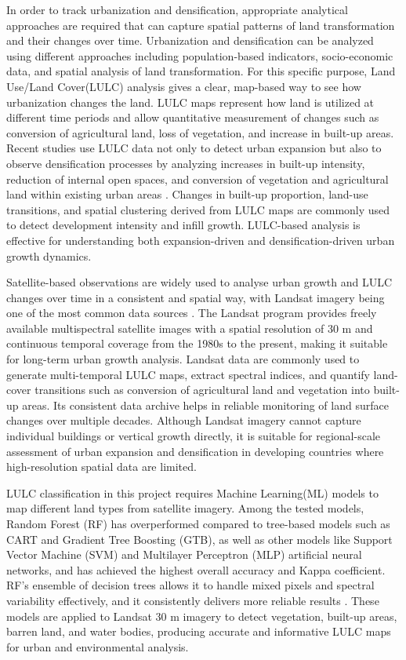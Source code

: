 \documentclass[main]{subfiles}
\begin{document}
In order to track urbanization and densification, appropriate analytical approaches are required that can capture spatial patterns of land transformation and their changes over time. Urbanization and densification can be analyzed using different approaches including population-based indicators, socio-economic data, and spatial analysis of land transformation. For this specific purpose, Land Use/Land Cover(LULC) analysis gives a clear, map-based way to see how urbanization changes the land. LULC maps represent how land is utilized at different time periods and allow quantitative measurement of changes such as conversion of agricultural land, loss of vegetation, and increase in built-up areas. Recent studies use LULC data not only to detect urban expansion but also to observe densification processes by analyzing increases in built-up intensity, reduction of internal open spaces, and conversion of vegetation and agricultural land within existing urban areas \cite{wang2020land,environments4040072}. Changes in built-up proportion, land-use transitions, and spatial clustering derived from LULC maps are commonly used to detect development intensity and infill growth. LULC-based analysis is effective for understanding both expansion-driven and densification-driven urban growth dynamics.

Satellite-based observations are widely used to analyse urban growth and LULC changes over time in a consistent and spatial way, with Landsat imagery being one of the most common data sources \cite{huang2021global}. The Landsat program provides freely available multispectral satellite images with a spatial resolution of 30 m and continuous temporal coverage from the 1980s to the present, making it suitable for long-term urban growth analysis. Landsat data are commonly used to generate multi-temporal LULC maps, extract spectral indices, and quantify land-cover transitions such as conversion of agricultural land and vegetation into built-up areas. Its consistent data archive helps in reliable monitoring of land surface changes over multiple decades. Although Landsat imagery cannot capture individual buildings or vertical growth directly, it is suitable for regional-scale assessment of urban expansion and densification in developing countries where high-resolution spatial data are limited.

LULC classification in this project requires Machine Learning(ML) models to map different land types from satellite imagery. Among the tested models, Random Forest (RF) has overperformed compared to tree-based models such as CART and Gradient Tree Boosting (GTB), as well as other models like Support Vector Machine (SVM) and Multilayer Perceptron (MLP) artificial neural networks, and has achieved the highest overall accuracy and Kappa coefficient. RF’s ensemble of decision trees allows it to handle mixed pixels and spectral variability effectively, and it consistently delivers more reliable results \cite{Ouma31122023,ZHAO2024129}. These models are applied to Landsat 30 m imagery to detect vegetation, built-up areas, barren land, and water bodies, producing accurate and informative LULC maps for urban and environmental analysis.
\end{document}
